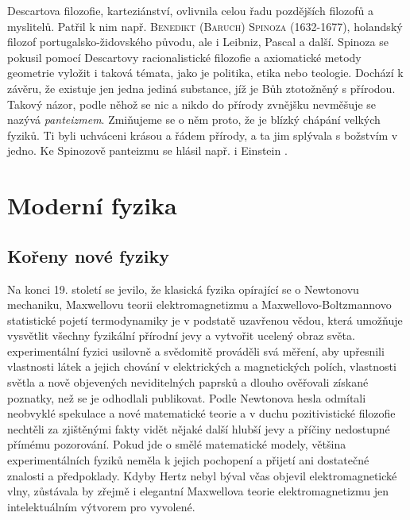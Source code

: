      Descartova filozofie, karteziánství, ovlivnila celou řadu pozdějších filozofů a myslitelů.
      Patřil k nim např. \textsc{Benedikt (Baruch) Spinoza} (1632-1677), holandský filozof
      portugalsko-židovského původu, ale i Leibniz, Pascal a další. Spinoza se pokusil pomocí
      Descartovy racionalistické filozofie a axiomatické metody geometrie vyložit i taková témata,
      jako je politika, etika nebo teologie. Dochází k závěru, že existuje jen jedna jediná
      substance, jíž je Bůh ztotožněný s přírodou. Takový názor, podle něhož se nic a nikdo do
      přírody zvnějšku nevměšuje se nazývá \emph{panteizmem}. Zmiňujeme se o něm proto, že je blízký
      chápání velkých fyziků. Ti byli uchváceni krásou a řádem přírody, a ta jim splývala s božstvím
      v jedno. Ke Spinozově panteizmu se hlásil např. i Einstein \cite[s.~141]{Stoll2009}.    
  \section{Moderní fyzika}
    \subsection{Kořeny nové fyziky}
      Na konci 19. století se jevilo, že klasická fyzika opírající se o Newtonovu mechaniku,
      Maxwellovu teorii elektromagnetizmu a Maxwellovo-Boltzmannovo statistické pojetí termodynamiky
      je v podstatě uzavřenou vědou, která umožňuje vysvětlit všechny fyzikální přírodní jevy a
      vytvořit ucelený obraz světa.  experimentální fyzici usilovně a svědomitě
      prováděli svá měření, aby upřesnili vlastnosti látek a jejich chování v elektrických a
      magnetických polích, vlastnosti světla a nově objevených neviditelných paprsků a dlouho
      ověřovali získané poznatky, než se je odhodlali publikovat. Podle Newtonova hesla  odmítali neobvyklé spekulace a nové matematické teorie a v duchu pozitivistické
      filozofie nechtěli za zjištěnými fakty vidět nějaké další hlubší jevy a příčiny nedostupné
      přímému pozorování. Pokud jde o smělé matematické modely, většina experimentálních fyziků
      neměla k jejich pochopení a přijetí ani dostatečné znalosti a předpoklady. Kdyby Hertz nebyl
      býval včas objevil elektromagnetické vlny, zůstávala by zřejmě i elegantní Maxwellova teorie
      elektromagnetizmu jen intelektuálním výtvorem pro vyvolené.

